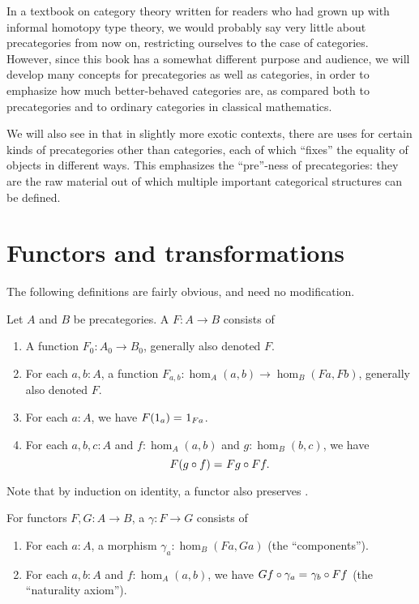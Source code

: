 In a textbook on category theory written for readers who had grown up with informal homotopy type theory, we would probably say very little about precategories from now on, restricting ourselves to the case of categories.
However, since this book has a somewhat different purpose and audience, we will develop many concepts for precategories as well as categories, in order to emphasize how much better-behaved categories are, as compared both to precategories and to ordinary categories in classical mathematics.

We will also see in  that in slightly more exotic contexts, there are uses for certain kinds of precategories other than categories, each of which ``fixes'' the equality of objects in different ways.
This emphasizes the ``pre''-ness of precategories: they are the raw material out of which multiple important categorical structures can be defined.


\section{Functors and transformations}
\label{sec:transfors}

The following definitions are fairly obvious, and need no modification.

\begin{defn}\label{ct:functor}
  Let $A$ and $B$ be precategories.
  A  $F:A\to B$ consists of
  \begin{enumerate}
  \item A function $F_0:A_0\to B_0$, generally also denoted $F$.
  \item For each $a,b:A$, a function $F_{a,b}:\hom_A(a,b) \to \hom_B(Fa,Fb)$, generally also denoted $F$.
  \item For each $a:A$, we have $F(1_a) =_{} 1_{Fa}$.
  \item For each $a,b,c:A$ and $f:\hom_A(a,b)$ and $g:\hom_B(b,c)$, we have
    \[F(g\circ f) =_{} Fg\circ Ff.\]
  \end{enumerate}
\end{defn}

Note that by induction on identity, a functor also preserves \idtoiso.

\begin{defn}\label{ct:nattrans}
  For functors $F,G:A\to B$, a  $\gamma:F\to G$ consists of
  \begin{enumerate}
  \item For each $a:A$, a morphism $\gamma_a:\hom_B(Fa,Ga)$ (the ``components'').
  \item For each $a,b:A$ and $f:\hom_A(a,b)$, we have $Gf\circ \gamma_a =_{} \gamma_b\circ Ff$ (the ``naturality axiom'').
  \end{enumerate}
\end{defn}

